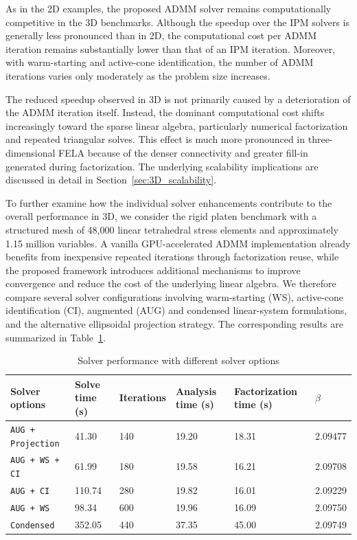 As in the 2D examples, the proposed ADMM solver remains computationally competitive in the 3D benchmarks. Although the speedup over the IPM solvers is generally less pronounced than in 2D, the computational cost per ADMM iteration remains substantially lower than that of an IPM iteration. Moreover, with warm-starting and active-cone identification, the number of ADMM iterations varies only moderately as the problem size increases.

The reduced speedup observed in 3D is not primarily caused by a deterioration of the ADMM iteration itself. Instead, the dominant computational cost shifts increasingly toward the sparse linear algebra, particularly numerical factorization and repeated triangular solves. This effect is much more pronounced in three-dimensional FELA because of the denser connectivity and greater fill-in generated during factorization. The underlying scalability implications are discussed in detail in Section~\ref{sec:3D_scalability}.

To further examine how the individual solver enhancements contribute to the overall performance in 3D, we consider the rigid platen benchmark with a structured mesh of 48,000 linear tetrahedral stress elements and approximately 1.15 million variables. A vanilla GPU-accelerated ADMM implementation already benefits from inexpensive repeated iterations through factorization reuse, while the proposed framework introduces additional mechanisms to improve convergence and reduce the cost of the underlying linear algebra. We therefore compare several solver configurations involving warm-starting (WS), active-cone identification (CI), augmented (AUG) and condensed linear-system formulations, and the alternative ellipsoidal projection strategy. The corresponding results are summarized in Table~\ref{tab:Ablation_table}.


\begin{table}[htbp]
\centering
\caption{Solver performance with different solver options}
\label{tab:Ablation_table}
\begin{tabular}{@{}p{3cm}p{1.8cm}p{1.6cm}p{2cm}p{2.5cm}p{1.4cm}@{}}
\toprule
\textbf{Solver options} & \textbf{Solve time (s)} & \textbf{Iterations} &  \textbf{Analysis time (s)} & \textbf{Factorization time (s)} & \textbf{$\beta$} \\
\midrule
\texttt{AUG + Projection} 	& 41.30  	& 140 	& 19.20 & 18.31 & 2.09477 \\
\texttt{AUG + WS + CI}    	& 61.99  	& 180	& 19.58 & 16.21 & 2.09708 \\
\texttt{AUG + CI}         	& 110.74	& 280 	& 19.82 & 16.01 & 2.09229 \\
\texttt{AUG + WS}         	& 98.34  	& 600 	& 19.96 & 16.09 & 2.09750 \\
\texttt{Condensed}        	& 352.05   & 440  	& 37.35 & 45.00 & 2.09749 \\

\bottomrule
\end{tabular}
\vspace{0.5em}
\end{table}

